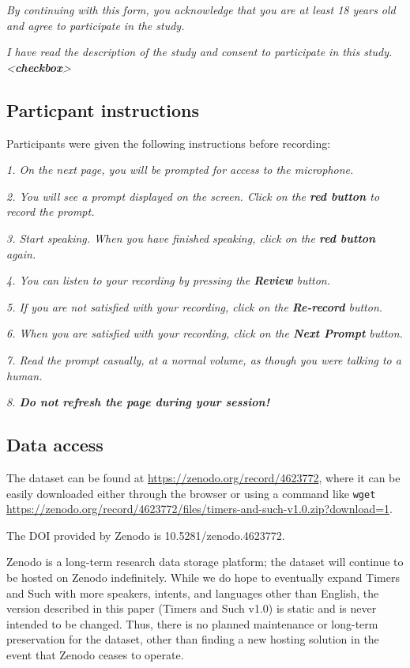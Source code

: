 \documentclass{article}
\begin{document}
                        \textit{By continuing with this form, you acknowledge that you are at least 18 years old and agree to participate in the study.}
                        
                        \textit{I have read the description of the study and consent to participate in this study. <\textbf{checkbox}>}
                        

\subsection{Particpant instructions}\label{participant-instructions}
Participants were given the following instructions before recording:

\textit{1. On the next page, you will be prompted for access to the microphone.}
    
\textit{2. You will see a prompt displayed on the screen. Click on the \textbf{red button} to record the prompt.}
    
\textit{3. Start speaking. When you have finished speaking, click on the \textbf{red button} again.}
    
\textit{4. You can listen to your recording by pressing the \textbf{Review} button.}
    
\textit{5. If you are not satisfied with your recording, click on the \textbf{Re-record} button.}
    
\textit{6. When you are satisfied with your recording, click on the \textbf{Next Prompt} button.}
    
\textit{7. Read the prompt casually, at a normal volume, as though you were talking to a human.}
    
\textit{8. \textbf{Do not refresh the page during your session!}}

\subsection{Data access}\label{data-access}

The dataset can be found at \url{https://zenodo.org/record/4623772}, where it can be easily downloaded either through the browser or using a command like \texttt{wget} \url{ https://zenodo.org/record/4623772/files/timers-and-such-v1.0.zip?download=1}. 

The DOI provided by Zenodo is 10.5281/zenodo.4623772.

Zenodo is a long-term research data storage platform; the dataset will continue to be hosted on Zenodo indefinitely. While we do hope to eventually expand Timers and Such with more speakers, intents, and languages other than English, the version described in this paper (Timers and Such v1.0) is static and is never intended to be changed. Thus, there is no planned maintenance or long-term preservation for the dataset, other than finding a new hosting solution in the event that Zenodo ceases to operate.
\end{document}
